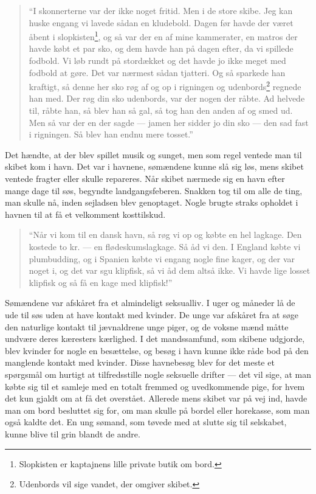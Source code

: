 \begin{quote}
``I skonnerterne var der ikke noget fritid. Men i de store skibe. Jeg
kan huske engang vi lavede sådan en kludebold. Dagen før havde der været
åbent i slopkisten\footnote{Slopkisten er kaptajnens lille private butik
  om bord.}, og så var der en af mine kammerater, en matros der havde
købt et par sko, og dem havde han på dagen efter, da vi spillede
fodbold. Vi løb rundt på stordækket og det havde jo ikke meget med
fodbold at gøre. Det var nærmest sådan tjatteri. Og så sparkede han
kraftigt, så denne her sko røg af og op i rigningen og
udenbords\footnote{Udenbords vil sige vandet, der omgiver skibet.}
regnede han med. Der røg din sko udenbords, var der nogen der råbte. Ad
helvede til, råbte han, så blev han så gal, så tog han den anden af og
smed ud. Men så var der en der sagde --- jamen her sidder jo din sko ---
den sad fast i rigningen. Så blev han endnu mere tosset.''
\end{quote}

Det hændte, at der blev spillet musik og sunget, men som regel ventede
man til skibet kom i havn. Det var i havnene, sømændene kunne slå sig
løs, mens skibet ventede fragter eller skulle repareres. Når skibet
nærmede sig en havn efter mange dage til søs, begyndte landgangsfeberen.
Snakken tog til om alle de ting, man skulle nå, inden sejladsen blev
genoptaget. Nogle brugte straks opholdet i havnen til at få et
velkomment kosttilskud.

\begin{quote}
``Når vi kom til en dansk havn, så røg vi op og købte en hel lagkage.
Den kostede to kr. --- en flødeskumslagkage. Så åd vi den. I England
købte vi plumbudding, og i Spanien købte vi engang nogle fine kager, og
der var noget i, og det var sgu klipfisk, så vi åd dem altså ikke. Vi
havde lige losset klipfisk og så få en kage med klipfisk!''
\end{quote}

Sømændene var afskåret fra et almindeligt seksualliv. I uger og måneder
lå de ude til søs uden at have kontakt med kvinder. De unge var afskåret
fra at søge den naturlige kontakt til jævnaldrene unge piger, og de
voksne mænd måtte undvære deres kæresters kærlighed. I det mandssamfund,
som skibene udgjorde, blev kvinder for nogle en besættelse, og besøg i
havn kunne ikke råde bod på den manglende kontakt med kvinder. Disse
havnebesøg blev for det meste et spørgsmål om hurtigt at tilfredsstille
nogle seksuelle drifter --- det vil sige, at man købte sig til et
samleje med en totalt fremmed og uvedkommende pige, for hvem det kun
gjaldt om at få det overstået. Allerede mens skibet var på vej ind,
havde man om bord besluttet sig for, om man skulle på bordel eller
horekasse, som man også kaldte det. En ung sømand, som tøvede med at
slutte sig til selskabet, kunne blive til grin blandt de andre.

